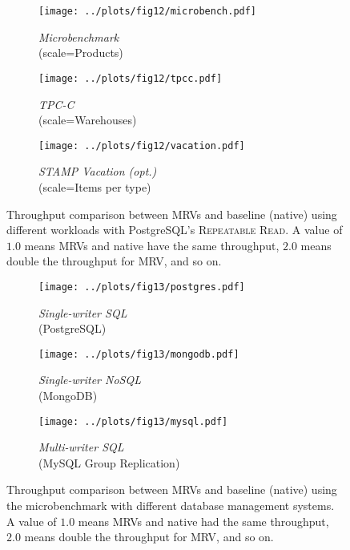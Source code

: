 \documentclass[border=2cm]{standalone}
\begin{document}
\begin{minipage}{17cm}
\vspace{1cm}

\begin{figure*}[h]
	\centering
	\captionsetup{justification=centering}
	\begin{subfigure}{.32\linewidth}
		\texttt{[image: ../plots/fig12/microbench.pdf]}
		\caption{\textit{Microbenchmark}\\(scale=Products)}
	\end{subfigure}
	\begin{subfigure}{.32\linewidth}
		\texttt{[image: ../plots/fig12/tpcc.pdf]}
		\caption{\textit{TPC-C}\\(scale=Warehouses)}
	\end{subfigure}
	\begin{subfigure}{.32\linewidth}
		\texttt{[image: ../plots/fig12/vacation.pdf]}
		\caption{\textit{STAMP Vacation (opt.)}\\(scale=Items per type)}
	\end{subfigure}
	\captionsetup{justification=justified}
	\caption{Throughput comparison between MRVs and baseline (native) using different workloads with PostgreSQL's \textsc{Repeatable Read}. \small \normalfont A value of $1.0$ means MRVs and native have the same throughput, $2.0$ means double the throughput for MRV, and so on.}
\end{figure*}

\vspace{1cm}

\begin{figure*}[h]
	\centering
	\captionsetup{justification=centering}
	\begin{subfigure}{.32\linewidth}
		\texttt{[image: ../plots/fig13/postgres.pdf]}
		\caption{\textit{Single-writer SQL}\\(PostgreSQL)}
	\end{subfigure}
	\begin{subfigure}{.32\linewidth}
		\texttt{[image: ../plots/fig13/mongodb.pdf]}
		\caption{\textit{Single-writer NoSQL}\\(MongoDB)}
	\end{subfigure}
	\begin{subfigure}{.32\linewidth}
		\texttt{[image: ../plots/fig13/mysql.pdf]}
		\caption{\textit{Multi-writer SQL}\\(MySQL Group Replication)}
	\end{subfigure}
	\captionsetup{justification=justified}
	\caption{Throughput comparison between MRVs and baseline (native) using the microbenchmark with different database management systems. \small \normalfont A value of $1.0$ means MRVs and native had the same throughput, $2.0$ means double the throughput for MRV, and so on.}
\end{figure*}


\end{minipage}
\end{document}
